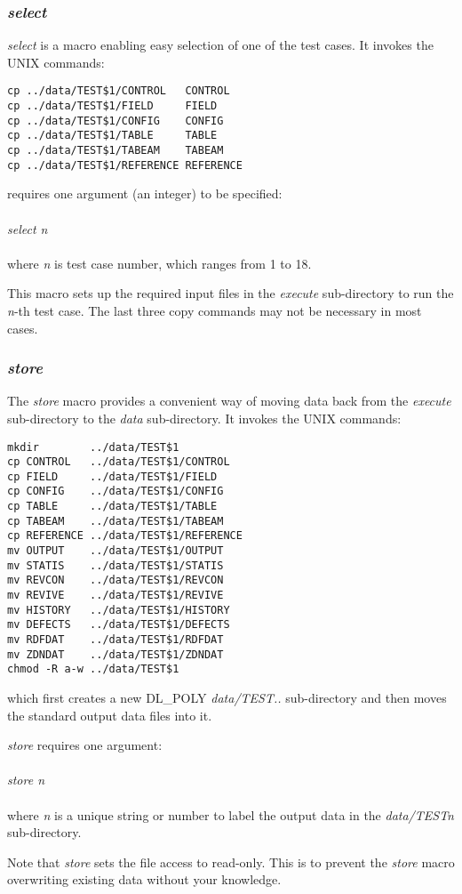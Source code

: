 \subsubsection*{{\sl select}}

{\sl select} is a macro enabling easy selection of one of the test
cases.  It invokes the UNIX commands:

\begin{verbatim}
cp ../data/TEST$1/CONTROL   CONTROL
cp ../data/TEST$1/FIELD     FIELD
cp ../data/TEST$1/CONFIG    CONFIG
cp ../data/TEST$1/TABLE     TABLE
cp ../data/TEST$1/TABEAM    TABEAM
cp ../data/TEST$1/REFERENCE REFERENCE
\end{verbatim}

 requires one argument (an integer) to be specified: \\
\\
{\sl select n} \\
\\
\noindent where {\sl n} is test case number, which ranges from 1 to
18.

This macro sets up the required input files in the {\em execute}
sub-directory to run the {\sl n}-th test
case.  The last three copy commands may not be necessary in
most cases.

\subsubsection*{{\sl store}}

The {\sl store} macro provides a convenient way of moving data
back from the {\em execute} sub-directory to
the {\em data} sub-directory.  It invokes the
UNIX commands:

\begin{verbatim}
mkdir        ../data/TEST$1
cp CONTROL   ../data/TEST$1/CONTROL
cp FIELD     ../data/TEST$1/FIELD
cp CONFIG    ../data/TEST$1/CONFIG
cp TABLE     ../data/TEST$1/TABLE
cp TABEAM    ../data/TEST$1/TABEAM
cp REFERENCE ../data/TEST$1/REFERENCE
mv OUTPUT    ../data/TEST$1/OUTPUT
mv STATIS    ../data/TEST$1/STATIS
mv REVCON    ../data/TEST$1/REVCON
mv REVIVE    ../data/TEST$1/REVIVE
mv HISTORY   ../data/TEST$1/HISTORY
mv DEFECTS   ../data/TEST$1/DEFECTS
mv RDFDAT    ../data/TEST$1/RDFDAT
mv ZDNDAT    ../data/TEST$1/ZDNDAT
chmod -R a-w ../data/TEST$1
\end{verbatim}

\noindent which first creates a new DL\_POLY {\em data/TEST..}
sub-directory and then moves the standard \D
output data files into it.

{\sl store} requires one argument:\\
\\
{\sl store n}\\
\\
\noindent where {\sl n} is a unique string or number to label the
output data in the {\em data/TESTn} sub-directory.

Note that {\sl store} sets the file access to read-only.  This is
to prevent the {\sl store} macro overwriting existing data without
your knowledge.
